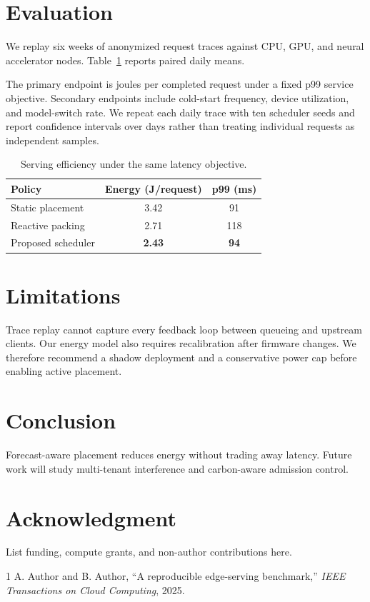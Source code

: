 \documentclass[conference]{IEEEtran}
\begin{document}
\section{Evaluation}
We replay six weeks of anonymized request traces against CPU, GPU, and neural
accelerator nodes. Table~\ref{tab:results} reports paired daily means.

The primary endpoint is joules per completed request under a fixed p99 service
objective. Secondary endpoints include cold-start frequency, device
utilization, and model-switch rate. We repeat each daily trace with ten
scheduler seeds and report confidence intervals over days rather than treating
individual requests as independent samples.

\begin{table}[b]
\caption{Serving efficiency under the same latency objective.}
\label{tab:results}
\centering
\begin{tabular}{lcc}
\toprule
Policy & Energy (J/request) & p99 (ms) \\
\midrule
Static placement & 3.42 & 91 \\
Reactive packing & 2.71 & 118 \\
Proposed scheduler & \textbf{2.43} & \textbf{94} \\
\bottomrule
\end{tabular}
\end{table}

\section{Limitations}
Trace replay cannot capture every feedback loop between queueing and upstream
clients. Our energy model also requires recalibration after firmware changes.
We therefore recommend a shadow deployment and a conservative power cap before
enabling active placement.

\section{Conclusion}
Forecast-aware placement reduces energy without trading away latency. Future
work will study multi-tenant interference and carbon-aware admission control.

\section*{Acknowledgment}
List funding, compute grants, and non-author contributions here.

\begin{thebibliography}{1}
 A. Author and B. Author, ``A reproducible edge-serving
benchmark,'' \emph{IEEE Transactions on Cloud Computing}, 2025.
\end{thebibliography}
\end{document}

